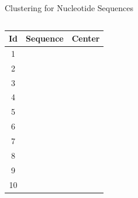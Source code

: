 \documentclass{beamer}
\begin{document}
\begin{frame}{Clustering for Nucleotide Sequences}

\begin{columns}
\begin{column}{0.5\textwidth}
{\footnotesize
\begin{tabular}{cll} \hline\hline
Id & Sequence             & Center \\ \hline
1  &  {} {} {} {} {} {} {} {} &
     \multirow{4}{*}{ {} {} {} {} {} {} {} {}} \\
2  &  {} {} {} {} {} {} {} {} & \\
3  &  {} {} {} {} {} {} {} {} & \\
4  &  {} {} {} {} {} {} {} {} & \\ \hline
5  &  {} {} {} {} {} {} {} {} &
     \multirow{2}{*}{ {} {} {} {} {} {} {} {}} \\
6  &  {} {} {} {} {} {} {} {} & \\ \hline
7  &  {} {} {} {} {} {} {} {} &
     \multirow{2}{*}{ {} {} {} {} {} {} {} {}} \\
8  &  {} {} {} {} {} {} {} {} & \\ \hline
9  &  {} {} {} {} {} {} {} {} &
     \multirow{2}{*}{ {} {} {} {} {} {} {} {}} \\
10 &  {} {} {} {} {} {} {} {} & \\ \hline\hline
\end{tabular}
}
\end{column}


\end{columns}
\end{frame}
\end{document}
